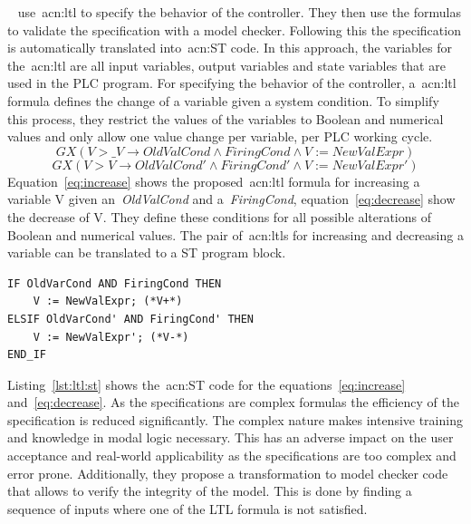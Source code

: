 \citeauthor{Kuzmin:2013}~\cite{Kuzmin:2013} use~\acrshort{acn:ltl} to specify the behavior of the controller.
They then use the formulas to validate the specification with a model checker.
Following this the specification is  automatically translated into~\acrshort{acn:ST} code.
In this approach, the variables for the~\acrshort{acn:ltl} are all input variables, output variables and state variables that are used in the PLC program.
For specifying the behavior of the controller, a~\acrfull{acn:ltl} formula defines the change of a variable given a system condition.
To simplify this process, they restrict the values of the variables to Boolean and numerical values and only allow one value change per variable, per PLC working cycle.
\begin{equation}
GX\left(V > \_V \rightarrow OldValCond \land FiringCond \land V := NewValExpr \right)
\label{eq:increase}
\end{equation}
\begin{equation}
GX\left(V > V \rightarrow OldValCond' \land FiringCond' \land V := NewValExpr' \right)
\label{eq:decrease}
\end{equation}
Equation~\ref{eq:increase} shows the proposed~\acrshort{acn:ltl} formula for increasing a variable V given an~\textit{OldValCond} and a~\textit{FiringCond}, equation~\ref{eq:decrease} show the decrease of V.
They define these conditions for all possible alterations of Boolean and numerical values.
The pair of~\acrshort{acn:ltl}s for increasing and decreasing a variable can be translated to a ST program block.
\lstset{language=Pascal}
\begin{lstlisting}[caption={
Auto-generated~\gls{acn:ST} code realizing the~\acrshort{acn:ltl} formulas~\ref{eq:decrease} and~\ref{eq:increase}.~\cite{Kuzmin:2013}},label=lst:ltl:st]
IF OldVarCond AND FiringCond THEN
    V := NewValExpr; (*V+*)
ELSIF OldVarCond' AND FiringCond' THEN
    V := NewValExpr'; (*V-*)
END_IF
\end{lstlisting}
Listing~\ref{lst:ltl:st} shows the~\acrshort{acn:ST} code for the equations~\ref{eq:increase} and~\ref{eq:decrease}.
As the specifications are complex formulas the efficiency of the specification is reduced significantly.
The complex nature makes intensive training and knowledge in modal logic necessary.
This has an adverse impact on the user acceptance and real-world applicability as the specifications are too complex and error prone.
Additionally, they propose a transformation to model checker code that allows to verify the integrity of the model.
This is done by finding a sequence of inputs where one of the LTL formula is not satisfied.
